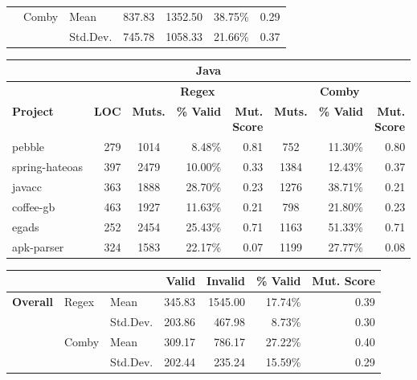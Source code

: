 \documentclass[acmsmall,screen,review,anonymous]{acmart}
\newcommand{\mr}[2]{\multirow{#1}{*}{#2}}
\newcommand{\mc}[3]{\multicolumn{#1}{#2}{#3}}
\begin{document}
{\begin{table}[hbtp]
\begin{varwidth}{.8\linewidth}
\begin{tabularx}{\linewidth}{Xllrrrr}
  & \multirow{2}{*}{Comby}  & Mean     & 837.83 & 1352.50 & 38.75\%  & 0.29\\
                         & & Std.Dev. & 745.78 & 1058.33 & 21.66\% & 0.37 \\\bottomrule
 \end{tabularx}
\begin{tabularx}{\linewidth}{X|r|crr|crr}
\toprule
\mc{8}{c}{\textbf{Java}} \\\midrule
                 &              & \multicolumn{3}{c|}{\textbf{Regex}} &\multicolumn{3}{c}{\textbf{Comby}}  \\
\textbf{Project} & \textbf{LOC} & \textbf{Muts.} & \textbf{\% Valid} & \makecell{\textbf{Mut.} \\ \textbf{Score}} &  \textbf{Muts.} &  \textbf{\% Valid} & \makecell{\textbf{Mut.} \\ \textbf{Score}} \\\midrule
 pebble         & 279 & 1014 & 8.48\% & 0.81 & 752 & 11.30\%  & 0.80 \\
 spring-hateoas & 397 & 2479 & 10.00\% & 0.33 & 1384 & 12.43\% & 0.37 \\
 javacc         & 363 & 1888 & 28.70\% & 0.23 & 1276 & 38.71\% & 0.21 \\
 coffee-gb      & 463 & 1927 & 11.63\% & 0.21 & 798 & 21.80\% & 0.23\\
 egads          & 252 & 2454 & 25.43\% & 0.71 & 1163 & 51.33\% & 0.71\\
 apk-parser     & 324 & 1583 & 22.17\% & 0.07 & 1199 & 27.77\% & 0.08 \\\bottomrule
\end{tabularx}
\begin{tabularx}{\linewidth}{Xllrrrr}
              & & & \textbf{Valid}  & \textbf{Invalid}  & \textbf{\% Valid} & \textbf{Mut. Score} \\\midrule
\multirow{4}{*}{\textbf{Overall}} & \mr{2}{Regex} & Mean     &  345.83 & 1545.00  & 17.74\% & 0.39\\
              &   & Std.Dev. & 203.86 & 467.98 & 8.73\%  & 0.30\\\cline{2-7}
& \mr{2}{Comby} & Mean     & 309.17 & 786.17 & 27.22\% & 0.40\\
              &   & Std.Dev. & 202.44 & 235.24  & 15.59\% & 0.29 \\\bottomrule

\end{tabularx}
\end{varwidth}
\end{table}}
\end{document}
